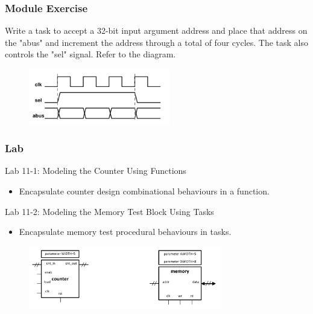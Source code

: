 \documentclass[t, notes, xcolor=table]{beamer}
\begin{document}
\begin{frame}
\frametitle{Module Exercise}
Write a task to accept a 32-bit input argument address and place that address on the "abus" and increment the address through a total of four cycles. The task also controls the "sel" signal. Refer to the diagram.
\begin{figure}
    \includegraphics[width=0.55\textwidth]{img/10_ex.png}
\end{figure}
\end{frame}

\begin{frame}
\frametitle{Lab}
Lab 11-1: Modeling the Counter Using Functions
\begin{itemize}
\item Encapsulate counter design combinational behaviours in a function.
\end{itemize}

Lab 11-2: Modeling the Memory Test Block Using Tasks
\begin{itemize}
\item Encapsulate memory test procedural behaviours in tasks.
\end{itemize}
\begin{figure}
    \includegraphics[width=0.75\textwidth]{img/10_lab.png}
\end{figure}
\end{frame}
\end{document}
